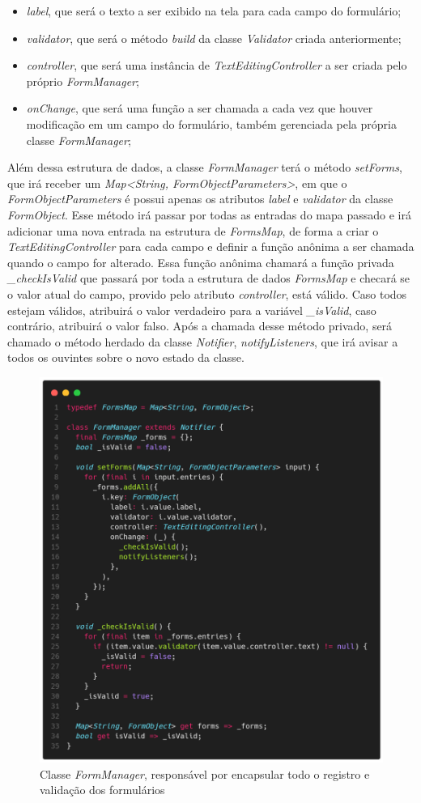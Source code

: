 \documentclass[12pt, %
openright, 
oneside, %
a4paper,    %
brazil]{facom-ufu-abntex2}
\begin{document}
\begin{itemize}
    \item \textit{label}, que será o texto a ser exibido na tela para cada campo do formulário;
    \item \textit{validator}, que será o método \textit{build} da classe \textit{Validator} criada anteriormente;
    \item \textit{controller}, que será uma instância de \textit{TextEditingController} a ser criada pelo próprio \textit{FormManager};
    \item \textit{onChange}, que será uma função a ser chamada a cada vez que houver modificação em um campo do formulário, também gerenciada pela própria classe \textit{FormManager};
\end{itemize}

Além dessa estrutura de dados, a classe \textit{FormManager} terá o método \textit{setForms}, que irá receber um \textit{Map<String, FormObjectParameters>}, em que o \textit{FormObjectParameters} é possui apenas os atributos \textit{label} e \textit{validator} da classe \textit{FormObject}. Esse método irá passar por todas as entradas do mapa passado e irá adicionar uma nova entrada na estrutura de \textit{FormsMap}, de forma a criar o \textit{TextEditingController} para cada campo e definir a função anônima a ser chamada quando o campo for alterado. Essa função anônima chamará a função privada \textit{\_checkIsValid} que passará por toda a estrutura de dados \textit{FormsMap} e checará se o valor atual do campo, provido pelo atributo \textit{controller}, está válido. Caso todos estejam válidos, atribuirá o valor verdadeiro para a variável \textit{\_isValid}, caso contrário, atribuirá o valor falso. Após a chamada desse método privado, será chamado o método herdado da classe \textit{Notifier}, \textit{notifyListeners}, que irá avisar a todos os ouvintes sobre o novo estado da classe.

\begin{figure}[ht]
    \centering
    \includegraphics[width=.7\textwidth, trim={0 30 0 100}, clip]{figures/forms/form_manager.png}
    \caption{Classe \textit{FormManager}, responsável por encapsular todo o registro e validação dos formulários}
    \label{fig:form_manager}
\end{figure}
\end{document}
